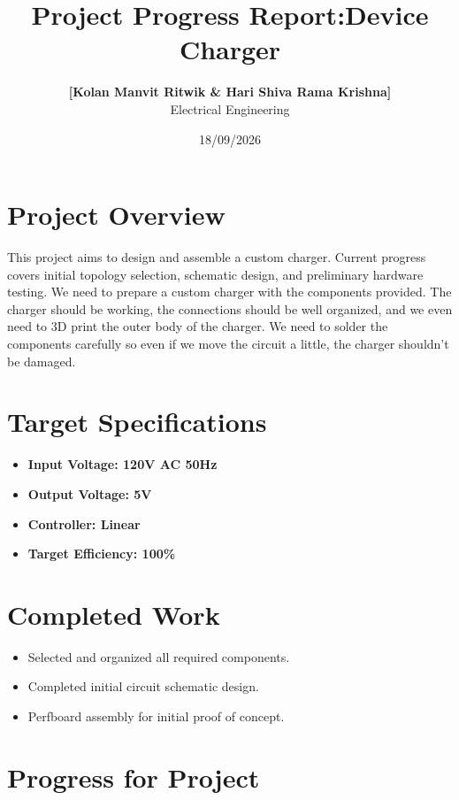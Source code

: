\documentclass[11pt, a4paper]{article}
\title{\textbf{Project Progress Report:Device Charger}}
\author{\textbf{[Kolan Manvit Ritwik \& Hari Shiva Rama Krishna]} \\ Electrical Engineering }
\date{18/09/2026}
\begin{document}
\maketitle

\section{Project Overview}
This project aims to design and assemble a custom charger.
Current progress covers initial topology selection, schematic design,
and preliminary hardware testing.
We need to prepare a custom charger with the components provided. The charger should be
working, the connections should be well organized, and we even need to 3D print the outer body of the
charger. We need to solder the components carefully so even if we move the circuit 
a little, the charger shouldn't be damaged. 

\section{Target Specifications}

\begin{itemize}
    \item \textbf{Input Voltage: 120V AC 50Hz}
    \item \textbf{Output Voltage: 5V} 
    \item \textbf{Controller: Linear} 
    \item \textbf{Target Efficiency: 100\%}
\end{itemize}

\section{Completed Work}
\begin{itemize}
    \item Selected and organized all required components.
    \item Completed initial circuit schematic design.
    \item Perfboard assembly for initial proof of concept.
\end{itemize}

\section{Progress for Project}
\end{document}

